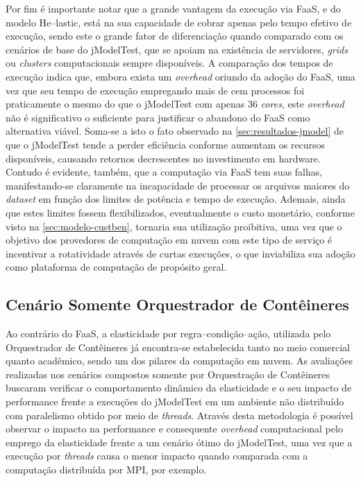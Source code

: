 \documentclass[english,brazilian]{UNISINOSmonografia} %
\begin{document}
Por fim é importante notar que a grande vantagem da execução via FaaS, e do modelo \textsf{He}--lastic, está na sua capacidade de cobrar apenas pelo tempo efetivo de execução, sendo este o grande fator de diferenciação quando comparado com os cenários de base do jModelTest, que se apoiam na existência de servidores, \textit{grids} ou \textit{clusters} computacionais sempre disponíveis.
%
A comparação dos tempos de execução indica que, embora exista um \textit{overhead} oriundo da adoção do FaaS, uma vez que seu tempo de execução empregando mais de cem processos foi praticamente o mesmo do que o jModelTest com apenas 36 \textit{cores}, este \textit{overhead} não é significativo o suficiente para justificar o abandono do FaaS como alternativa viável.
%
Soma-se a isto o fato observado na \autoref{sec:resultados-jmodel} de que o jModelTest tende a perder eficiência conforme aumentam os recursos disponíveis, 
causando retornos decrescentes no investimento em hardware.
%
Contudo é evidente, também, que a computação via FaaS tem suas falhas, manifestando-se claramente na incapacidade de processar os arquivos maiores do \textit{dataset} em função dos limites de potência e tempo de execução.
%
Ademais, ainda que estes limites fossem flexibilizados, eventualmente o custo monetário, conforme visto na \autoref{sec:modelo-custben}, tornaria sua utilização proibitiva, uma vez que o objetivo dos provedores de computação em nuvem com este tipo de serviço é incentivar a rotatividade através de curtas execuções, o que inviabiliza sua adoção como plataforma de computação de propósito geral.








\subsection{Cenário Somente Orquestrador de Contêineres}


Ao contrário do FaaS, a elasticidade por regra--condição--ação, utilizada pelo Orquestrador de Contêineres já encontra-se estabelecida tanto no meio comercial quanto acadêmico, sendo um dos pilares da computação em nuvem.
%
As avaliações realizadas nos cenários compostos somente por Orquestração de Contêineres buscaram verificar o comportamento dinâmico da elasticidade e o seu impacto de performance frente a execuções do jModelTest em um ambiente não distribuído com paralelismo obtido por meio de \textit{threads}.
%
Através desta metodologia é possível observar o impacto na performance e consequente \textit{overhead} computacional pelo emprego da elasticidade frente a um cenário ótimo do jModelTest, uma vez que a execução por \textit{threads} causa o menor impacto quando comparada com a computação distribuída por MPI, por exemplo.
\end{document}
